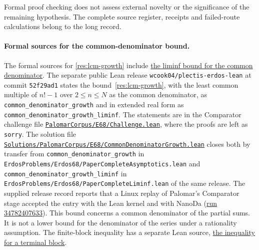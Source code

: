 \documentclass[11pt]{article}
\begin{document}
Formal proof checking does not assess external novelty or the significance
of the remaining hypothesis.  The complete source register, receipts and
failed-route calculations belong to the long record.

\par\endgroup

\paragraph{Formal sources for the common-denominator bound.}
The formal sources for \eqref{res:lcm-growth} include
\href{https://github.com/wcook04/plectis-erdos/blob/0b500c7cf8e8bb7ae343484378df02f277fb8194/lean/ErdosProblems/Erdos68/PaperCompleteLiminf.lean#L42}{the liminf bound for the common denominator}.
The separate public Lean release
\nolinkurl{wcook04/plectis-erdos-lean}
at commit \texttt{52f29ad1} states the bound~\eqref{res:lcm-growth}, with the
least common multiple of $n!-1$ over $2\le n\le N$ as the common denominator,
as \texttt{common\_denominator\_growth} and in extended real form as
\texttt{common\_denominator\_growth\_liminf}.  The statements are in the
Comparator challenge file
\href{https://github.com/wcook04/plectis-erdos-lean/blob/52f29ad173b04e3bac941b3663f2b9aebe5de0bb/PalomarCorpus/E68/Challenge.lean#L249}{\nolinkurl{PalomarCorpus/E68/Challenge.lean}},
where the proofs are left as \texttt{sorry}.  The solution file
\href{https://github.com/wcook04/plectis-erdos-lean/blob/52f29ad173b04e3bac941b3663f2b9aebe5de0bb/Solutions/PalomarCorpus/E68/CommonDenominatorGrowth.lean#L17}{\nolinkurl{Solutions/PalomarCorpus/E68/CommonDenominatorGrowth.lean}}
closes both by transfer from \texttt{common\_denominator\_growth} in
\nolinkurl{ErdosProblems/Erdos68/PaperCompleteAsymptotics.lean} and
\texttt{common\_denominator\_growth\_liminf} in
\nolinkurl{ErdosProblems/Erdos68/PaperCompleteLiminf.lean} of the same release.
The supplied release record reports that a Linux replay of Palomar's
Comparator stage accepted the entry with the Lean kernel and with NanoDa
(\href{https://github.com/wcook04/plectis-erdos-lean/actions/runs/34782407633}{run 34782407633}).
This bound concerns a common denominator of the partial sums. It is not
a lower bound for the denominator of the series under a rationality
assumption.
The finite-block inequality has a separate
Lean source,
\href{https://github.com/wcook04/plectis-erdos/blob/d788dd4b8c59f2246000f2ed98fffb8a5e8ac72e/lean/ErdosProblems/Erdos68/ChannelIntegralCongruence.lean#L524-L529}{the inequality for a terminal block}.
\end{document}
